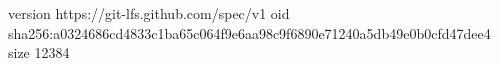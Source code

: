 version https://git-lfs.github.com/spec/v1
oid sha256:a0324686cd4833c1ba65c064f9e6aa98c9f6890e71240a5db49e0b0cfd47dee4
size 12384
